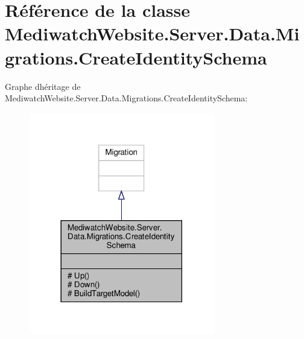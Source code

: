 \hypertarget{class_mediwatch_website_1_1_server_1_1_data_1_1_migrations_1_1_create_identity_schema}{}\section{Référence de la classe Mediwatch\+Website.\+Server.\+Data.\+Migrations.\+Create\+Identity\+Schema}
\label{class_mediwatch_website_1_1_server_1_1_data_1_1_migrations_1_1_create_identity_schema}


Graphe d\textquotesingle{}héritage de Mediwatch\+Website.\+Server.\+Data.\+Migrations.\+Create\+Identity\+Schema\+:\nopagebreak
\begin{figure}[H]
\begin{center}
\leavevmode
\includegraphics[width=230pt]{class_mediwatch_website_1_1_server_1_1_data_1_1_migrations_1_1_create_identity_schema__inherit__graph}
\end{center}
\end{figure}


